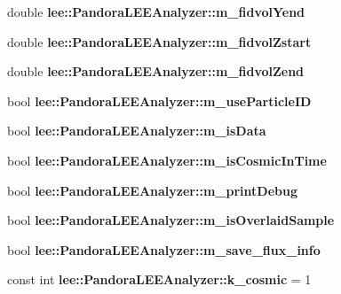 \begin{DoxyCompactItemize}
\item 
\hypertarget{group__lee_gad8b5a3fbf63831101e06bf3f7c831a03}{double {\bfseries lee\-::\-Pandora\-L\-E\-E\-Analyzer\-::m\-\_\-fidvol\-Yend}}\label{group__lee_gad8b5a3fbf63831101e06bf3f7c831a03}

\item 
\hypertarget{group__lee_ga2ecd11cab7811730100be8a133cb686f}{double {\bfseries lee\-::\-Pandora\-L\-E\-E\-Analyzer\-::m\-\_\-fidvol\-Zstart}}\label{group__lee_ga2ecd11cab7811730100be8a133cb686f}

\item 
\hypertarget{group__lee_gab2b230f2c1c2991564e8078fa7ce52e9}{double {\bfseries lee\-::\-Pandora\-L\-E\-E\-Analyzer\-::m\-\_\-fidvol\-Zend}}\label{group__lee_gab2b230f2c1c2991564e8078fa7ce52e9}

\item 
\hypertarget{group__lee_ga0418238c0019b7fe0bad6117348ff4f3}{bool {\bfseries lee\-::\-Pandora\-L\-E\-E\-Analyzer\-::m\-\_\-use\-Particle\-I\-D}}\label{group__lee_ga0418238c0019b7fe0bad6117348ff4f3}

\item 
\hypertarget{group__lee_ga6dde30dd232da74cc8e5735babb021c8}{bool {\bfseries lee\-::\-Pandora\-L\-E\-E\-Analyzer\-::m\-\_\-is\-Data}}\label{group__lee_ga6dde30dd232da74cc8e5735babb021c8}

\item 
\hypertarget{group__lee_ga10e86bba3e7853bdf00765cb996830fb}{bool {\bfseries lee\-::\-Pandora\-L\-E\-E\-Analyzer\-::m\-\_\-is\-Cosmic\-In\-Time}}\label{group__lee_ga10e86bba3e7853bdf00765cb996830fb}

\item 
\hypertarget{group__lee_ga355302cac15228cf63650efc20765ab8}{bool {\bfseries lee\-::\-Pandora\-L\-E\-E\-Analyzer\-::m\-\_\-print\-Debug}}\label{group__lee_ga355302cac15228cf63650efc20765ab8}

\item 
\hypertarget{group__lee_gaf8c9bf05e68b489be6944d9b6ad9075f}{bool {\bfseries lee\-::\-Pandora\-L\-E\-E\-Analyzer\-::m\-\_\-is\-Overlaid\-Sample}}\label{group__lee_gaf8c9bf05e68b489be6944d9b6ad9075f}

\item 
\hypertarget{group__lee_ga9f323d5b266d64aa73a45e50ac3e1fe6}{bool {\bfseries lee\-::\-Pandora\-L\-E\-E\-Analyzer\-::m\-\_\-save\-\_\-flux\-\_\-info}}\label{group__lee_ga9f323d5b266d64aa73a45e50ac3e1fe6}

\item 
\hypertarget{group__lee_ga048d617faeb0aadea21f43c805dadb1f}{const int {\bfseries lee\-::\-Pandora\-L\-E\-E\-Analyzer\-::k\-\_\-cosmic} = 1}\label{group__lee_ga048d617faeb0aadea21f43c805dadb1f}


\end{DoxyCompactItemize}

